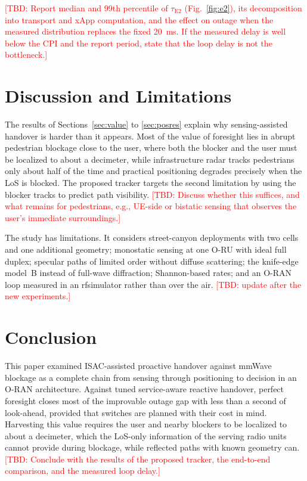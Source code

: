 \documentclass[journal]{IEEEtran}
\newcommand{\tbd}[1]{\textcolor{red}{[TBD: #1]}}
\begin{document}
\tbd{Report median and 99th percentile of $\tau_{\mathrm{E2}}$
(Fig.~\ref{fig:e2}), its decomposition into transport and xApp
computation, and the effect on outage when the measured distribution
replaces the fixed \SI{20}{ms}. If the measured delay is well below the
CPI and the report period, state that the loop delay is not the
bottleneck.}

\section{Discussion and Limitations}
The results of Sections~\ref{sec:value} to \ref{sec:posres} explain why sensing-assisted
handover is harder than it appears. Most of the value of foresight lies in
abrupt pedestrian blockage close to the user, where both the blocker and
the user must be localized to about a decimeter, while infrastructure
radar tracks pedestrians only about half of the time and practical
positioning degrades precisely when the LoS is blocked. The proposed
tracker targets the second limitation by using the blocker tracks to
predict path visibility. \tbd{Discuss whether this suffices, and what
remains for pedestrians, e.g., UE-side or bistatic sensing that observes
the user's immediate surroundings.}

The study has limitations. It considers street-canyon deployments with
two cells \textcolor{propcol}{and one additional geometry}; monostatic
sensing at one O-RU with ideal full duplex; specular paths of limited
order without diffuse scattering; the knife-edge model~B instead of
full-wave diffraction; Shannon-based rates; and an O-RAN loop measured in
an rfsimulator rather than over the air. \tbd{update after the new
experiments.}

\section{Conclusion}
This paper examined ISAC-assisted proactive handover against mmWave
blockage as a complete chain from sensing through positioning to
decision in an O-RAN architecture. Against tuned service-aware reactive
handover, perfect foresight closes most of the improvable outage gap with
less than a second of look-ahead, provided that switches are planned
with their cost in mind. Harvesting this value requires the user and
nearby blockers to be localized to about a decimeter, which the
LoS-only information of the serving radio units cannot provide during
blockage, while reflected paths with known geometry can.
\tbd{Conclude with the results of the proposed tracker, the end-to-end
comparison, and the measured loop delay.}
\end{document}
